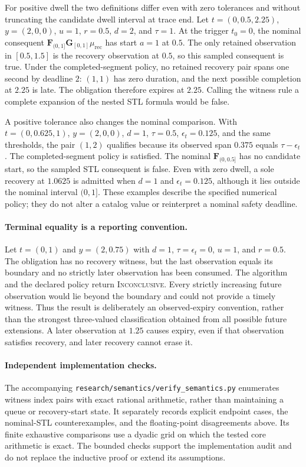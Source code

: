 For positive dwell the two definitions differ even with zero tolerances and without truncating the candidate dwell interval at trace end. Let $t=(0,0.5,2.25)$, $y=(2,0,0)$, $u=1$, $r=0.5$, $d=2$, and $\tau=1$. At the trigger $t_0=0$, the nominal consequent $\mathbf{F}_{(0,1]}\mathbf{G}_{[0,1]}\mu_{\mathrm{rec}}$ has start $a=1$ at $0.5$. The only retained observation in $[0.5,1.5]$ is the recovery observation at $0.5$, so this sampled consequent is true. Under the completed-segment policy, no retained recovery pair spans one second by deadline $2$: $(1,1)$ has zero duration, and the next possible completion at $2.25$ is late. The obligation therefore expires at $2.25$. Calling the witness rule a complete expansion of the nested STL formula would be false.

A positive tolerance also changes the nominal comparison. With $t=(0,0.625,1)$, $y=(2,0,0)$, $d=1$, $\tau=0.5$, $\epsilon_t=0.125$, and the same thresholds, the pair $(1,2)$ qualifies because its observed span $0.375$ equals $\tau-\epsilon_t$. The completed-segment policy is satisfied. The nominal $\mathbf{F}_{(0,0.5]}$ has no candidate start, so the sampled STL consequent is false. Even with zero dwell, a sole recovery at $1.0625$ is admitted when $d=1$ and $\epsilon_t=0.125$, although it lies outside the nominal interval $(0,1]$. These examples describe the specified numerical policy; they do not alter a catalog value or reinterpret a nominal safety deadline.

\paragraph{Terminal equality is a reporting convention.}
Let $t=(0,1)$ and $y=(2,0.75)$ with $d=1$, $\tau=\epsilon_t=0$, $u=1$, and $r=0.5$. The obligation has no recovery witness, but the last observation equals its boundary and no strictly later observation has been consumed. The algorithm and the declared policy return \textsc{Inconclusive}. Every strictly increasing future observation would lie beyond the boundary and could not provide a timely witness. Thus the result is deliberately an observed-expiry convention, rather than the strongest three-valued classification obtained from all possible future extensions. A later observation at $1.25$ causes expiry, even if that observation satisfies recovery, and later recovery cannot erase it.

\paragraph{Independent implementation checks.}
The accompanying \nolinkurl{research/semantics/verify_semantics.py} enumerates witness index pairs with exact rational arithmetic, rather than maintaining a queue or recovery-start state. It separately records explicit endpoint cases, the nominal-STL counterexamples, and the floating-point disagreements above. Its finite exhaustive comparisons use a dyadic grid on which the tested core arithmetic is exact. The bounded checks support the implementation audit and do not replace the inductive proof or extend its assumptions.
